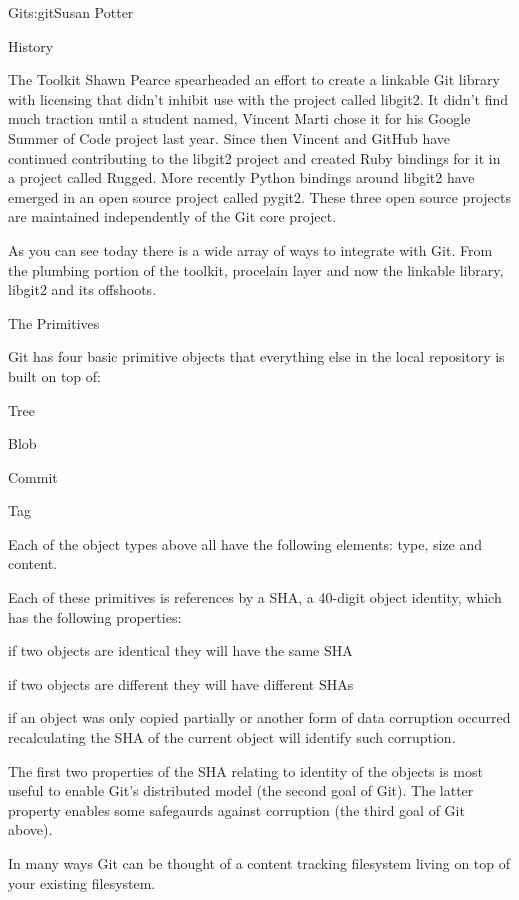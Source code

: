 \begin{aosachapter}{Git}{s:git}{Susan Potter}
\begin{aosasect1}{History}
\begin{aosasect1}{The Toolkit}
Shawn Pearce spearheaded an effort to create a linkable Git library with
licensing that didn't inhibit use with the project called libgit2. It didn't
find much traction until a student named, Vincent Marti chose it for his
Google Summer of Code project last year. Since then Vincent and GitHub have
continued contributing to the libgit2 project and created Ruby bindings
for it in a project called Rugged. More recently Python bindings around
libgit2 have emerged in an open source project called pygit2. These three
open source projects are maintained independently of the Git core project.

As you can see today there is a wide array of ways to integrate with Git.
From the plumbing portion of the toolkit, procelain layer and now the
linkable library, libgit2 and its offshoots.

\begin{aosasect1}{The Primitives}

Git has four basic primitive objects that everything else in the local
repository is built on top of:
\begin{aosaitemize}
  \item Tree
  \item Blob
  \item Commit
  \item Tag
\end{aosaitemize}

Each of the object types above all have the following elements: type, size and
content.

Each of these primitives is references by a SHA, a 40-digit object identity,
which has the following properties:
\begin{aosaitemize}
  \item if two objects are identical they will have the same SHA
  \item if two objects are different they will have different SHAs
  \item if an object was only copied partially or another form of data
        corruption occurred recalculating the SHA of the current object
        will identify such corruption.
\end{aosaitemize}

The first two properties of the SHA relating to identity of the objects is
most useful to enable Git's distributed model (the second goal of Git).
The latter property enables some safegaurds against corruption (the third goal
of Git above).

In many ways Git can be thought of a content tracking filesystem living on top
of your existing filesystem.



\end{aosasect1}
\end{aosasect1}
\end{aosasect1}
\end{aosachapter}
